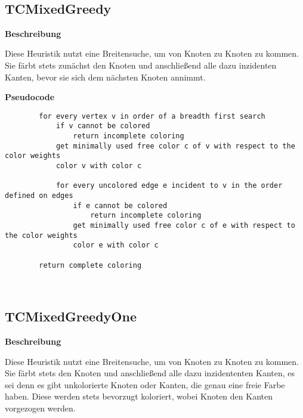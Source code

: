 \documentclass{article}
\begin{document}
	
	~\newpage
	
	\subsection{TCMixedGreedy}
	
	\textbf{Beschreibung}
	
	Diese Heuristik nutzt eine Breitensuche, um von Knoten zu Knoten zu kommen. Sie färbt stets zunächst den Knoten und anschließend alle dazu inzidenten Kanten, bevor sie sich dem nächsten Knoten annimmt.
	
	\textbf{Pseudocode}
	\begin{verbatim}
		for every vertex v in order of a breadth first search
		    if v cannot be colored
		        return incomplete coloring
		    get minimally used free color c of v with respect to the color weights
		    color v with color c
				    
		    for every uncolored edge e incident to v in the order defined on edges
		        if e cannot be colored
		            return incomplete coloring
		        get minimally used free color c of e with respect to the color weights
		        color e with color c
				        
		return complete coloring
	\end{verbatim}
			
	~\newpage
	
	\subsection{TCMixedGreedyOne}
	
	\textbf{Beschreibung}
	
	Diese Heuristik nutzt eine Breitensuche, um von Knoten zu Knoten zu kommen. Sie färbt stets den Knoten und anschließend alle dazu inzidententen Kanten, es sei denn es gibt unkolorierte Knoten oder Kanten, die genau eine freie Farbe haben. Diese werden stets bevorzugt koloriert, wobei Knoten den Kanten vorgezogen werden.
	
\end{document}
